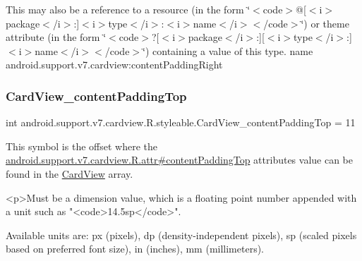 This may also be a reference to a resource (in the form \char`\"{}$<$code$>$@\mbox{[}$<$i$>$package$<$/i$>$\+:\mbox{]}$<$i$>$type$<$/i$>$\+:$<$i$>$name$<$/i$>$$<$/code$>$\char`\"{}) or theme attribute (in the form \char`\"{}$<$code$>$?\mbox{[}$<$i$>$package$<$/i$>$\+:\mbox{]}\mbox{[}$<$i$>$type$<$/i$>$\+:\mbox{]}$<$i$>$name$<$/i$>$$<$/code$>$\char`\"{}) containing a value of this type.  name android.\+support.\+v7.\+cardview\+:content\+Padding\+Right \mbox{\label{classandroid_1_1support_1_1v7_1_1cardview_1_1R_1_1styleable_a5027a3856e6f3bdd41006d07bbd06823}} 
\subsubsection{\texorpdfstring{Card\+View\+\_\+content\+Padding\+Top}{CardView\_contentPaddingTop}}
{\footnotesize\ttfamily int android.\+support.\+v7.\+cardview.\+R.\+styleable.\+Card\+View\+\_\+content\+Padding\+Top = 11\hspace{0.3cm}{\ttfamily [static]}}

This symbol is the offset where the \hyperlink{classandroid_1_1support_1_1v7_1_1cardview_1_1R_1_1attr_affac5138f598c72e4b2d2e4d10e53711}{android.\+support.\+v7.\+cardview.\+R.\+attr\#content\+Padding\+Top} attribute\textquotesingle{}s value can be found in the \hyperlink{classandroid_1_1support_1_1v7_1_1cardview_1_1R_1_1styleable_ad08b98a07471f174f404c58941fc82ca}{Card\+View} array.

\begin{DoxyVerb}      <p>Must be a dimension value, which is a floating point number appended with a unit such as "<code>14.5sp</code>".
\end{DoxyVerb}
 Available units are\+: px (pixels), dp (density-\/independent pixels), sp (scaled pixels based on preferred font size), in (inches), mm (millimeters). 

